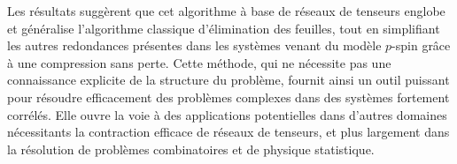 Les résultats suggèrent que cet algorithme à base de réseaux de tenseurs englobe et généralise l'algorithme classique d'élimination des feuilles, tout en simplifiant les autres redondances présentes dans les systèmes venant du modèle $p$-spin grâce à une compression sans perte.
Cette méthode, qui ne nécessite pas une connaissance explicite de la structure du problème, fournit ainsi un outil puissant pour résoudre efficacement des problèmes complexes dans des systèmes fortement corrélés.
Elle ouvre la voie à des applications potentielles dans d'autres domaines nécessitants la contraction efficace de réseaux de tenseurs, et plus largement dans la résolution de problèmes combinatoires et de physique statistique.
